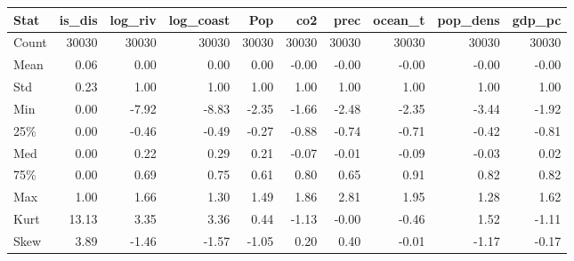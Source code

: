 \begin{table}[htbp]
\centering
{}
\label{tab:geo_sum_laos_neigh}
\footnotesize
\setlength{\tabcolsep}{4pt}
\renewcommand{\arraystretch}{0.9}
\begin{tabular}{lrrrrrrrrr}
\toprule
\textbf{Stat} & \textbf{is\_dis} & \textbf{log\_riv} & \textbf{log\_coast} & \textbf{Pop} & \textbf{co2} & \textbf{prec} & \textbf{ocean\_t} & \textbf{pop\_dens} & \textbf{gdp\_pc} \\
\midrule
Count & 30030 & 30030 & 30030 & 30030 & 30030 & 30030 & 30030 & 30030 & 30030 \\
Mean & 0.06 & 0.00 & 0.00 & 0.00 & -0.00 & -0.00 & -0.00 & -0.00 & -0.00 \\
Std & 0.23 & 1.00 & 1.00 & 1.00 & 1.00 & 1.00 & 1.00 & 1.00 & 1.00 \\
Min & 0.00 & -7.92 & -8.83 & -2.35 & -1.66 & -2.48 & -2.35 & -3.44 & -1.92 \\
25\% & 0.00 & -0.46 & -0.49 & -0.27 & -0.88 & -0.74 & -0.71 & -0.42 & -0.81 \\
Med & 0.00 & 0.22 & 0.29 & 0.21 & -0.07 & -0.01 & -0.09 & -0.03 & 0.02 \\
75\% & 0.00 & 0.69 & 0.75 & 0.61 & 0.80 & 0.65 & 0.91 & 0.82 & 0.82 \\
Max & 1.00 & 1.66 & 1.30 & 1.49 & 1.86 & 2.81 & 1.95 & 1.28 & 1.62 \\
Kurt & 13.13 & 3.35 & 3.36 & 0.44 & -1.13 & -0.00 & -0.46 & 1.52 & -1.11 \\
Skew & 3.89 & -1.46 & -1.57 & -1.05 & 0.20 & 0.40 & -0.01 & -1.17 & -0.17 \\
\bottomrule
\end{tabular}
\end{table}
